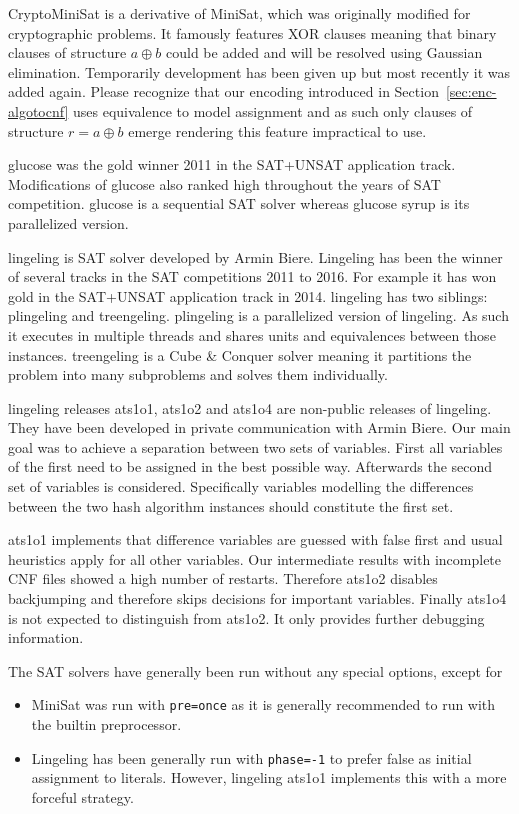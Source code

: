 CryptoMiniSat is a derivative of MiniSat, which was originally modified
for cryptographic problems. It famously features XOR clauses meaning that
binary clauses of structure $a \oplus b$ could be added and will be resolved
using Gaussian elimination. Temporarily development has been given up
but most recently it was added again. Please recognize that our encoding
introduced in Section~\ref{sec:enc-algotocnf} uses equivalence to model
assignment and as such only clauses of structure $r = a \oplus b$ emerge
rendering this feature impractical to use.

glucose was the gold winner 2011 in the SAT+UNSAT application track.
Modifications of glucose also ranked high throughout the years of SAT competition.
glucose is a sequential SAT solver whereas glucose syrup is its parallelized
version.

lingeling is SAT solver developed by Armin Biere. Lingeling has been the
winner of several tracks in the SAT competitions 2011 to 2016. For example
it has won gold in the SAT+UNSAT application track in 2014.
lingeling has two siblings: plingeling and treengeling. plingeling is a
parallelized version of lingeling. As such it executes in multiple threads
and shares units and equivalences between those instances. treengeling
is a Cube \& Conquer solver meaning it partitions the problem into many
subproblems and solves them individually.

lingeling releases ats1o1, ats1o2 and ats1o4 are non-public releases of lingeling.
They have been developed in private communication with Armin Biere.
Our main goal was to achieve a separation between two sets of variables.
First all variables of the first need to be assigned in the best possible
way. Afterwards the second set of variables is considered.
Specifically variables modelling the differences between the two hash
algorithm instances should constitute the first set.

ats1o1 implements that difference variables are guessed with false first and
usual heuristics apply for all other variables.
Our intermediate results with incomplete CNF files showed a high number of restarts.
Therefore ats1o2 disables backjumping and therefore skips decisions for important variables.
Finally ats1o4 is not expected to distinguish from ats1o2. It only provides further debugging information.

The SAT solvers have generally been run without any special options, except for
\begin{itemize}
  \item MiniSat was run with \texttt{\textendash{}\textendash{}pre=once} as it is generally recommended to run with the builtin preprocessor.
  \item Lingeling has been generally run with \texttt{\textendash{}\textendash{}phase=-1} to prefer false as initial assignment to literals.
    However, lingeling ats1o1 implements this with a more forceful strategy.
\end{itemize}

